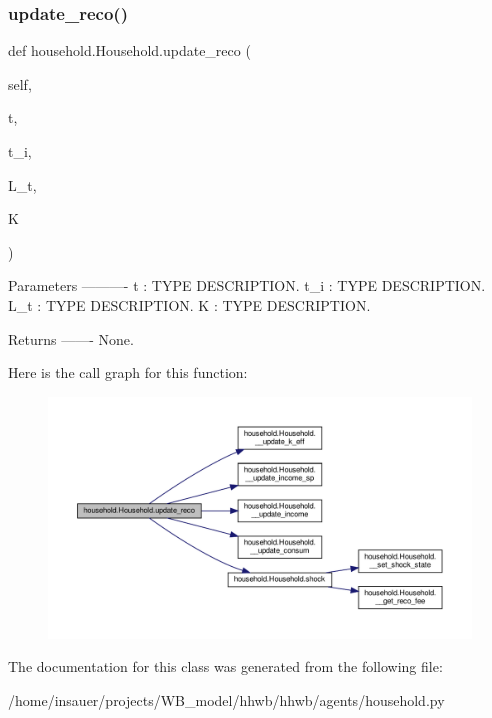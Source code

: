 \subsubsection{\texorpdfstring{update\+\_\+reco()}{update\_reco()}}
{\footnotesize\ttfamily def household.\+Household.\+update\+\_\+reco (\begin{DoxyParamCaption}\item[{}]{self,  }\item[{}]{t,  }\item[{}]{t\+\_\+i,  }\item[{}]{L\+\_\+t,  }\item[{}]{K }\end{DoxyParamCaption})}

\begin{DoxyVerb}Parameters
----------
t : TYPE
    DESCRIPTION.
t_i : TYPE
    DESCRIPTION.
L_t : TYPE
    DESCRIPTION.
K : TYPE
    DESCRIPTION.

Returns
-------
None.\end{DoxyVerb}
 Here is the call graph for this function\+:\nopagebreak
\begin{figure}[H]
\begin{center}
\leavevmode
\includegraphics[width=350pt]{classhousehold_1_1Household_a96a14035a0b3c03c6cf951251d5f941e_cgraph}
\end{center}
\end{figure}


The documentation for this class was generated from the following file\+:\begin{DoxyCompactItemize}
\item 
/home/insauer/projects/\+W\+B\+\_\+model/hhwb/hhwb/agents/household.\+py\end{DoxyCompactItemize}
